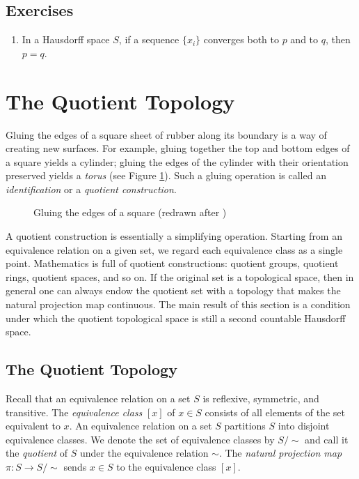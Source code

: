 \subsection{Exercises}
\begin{enumerate}
	\item   In a Hausdorff space $S$, if a sequence $\{x_i\}$ converges both to
	      $p$ and to $q$, then $p=q$.

\end{enumerate}




\section{The Quotient Topology}
\label{sec:quotient-topology}

Gluing the edges of a square sheet of rubber along its boundary is a way of
creating new surfaces. For example, gluing together the top and bottom edges
of a square yields a cylinder; gluing the edges of the cylinder with their
orientation preserved yields a \emph{torus} (see Figure
\ref{fig:glue-edge-of-a-square}). Such a gluing operation is called an
\emph{identification} or a \emph{quotient construction}.

\begin{figure}[ht]
	\centering
	\caption{Gluing the edges of a square (redrawn after
		\cite{tu_introduction_2011})}
	\label{fig:glue-edge-of-a-square}
\end{figure}

A quotient construction is essentially a simplifying operation. Starting from
an equivalence relation on a given set, we regard each equivalence class as a
single point. Mathematics is full of quotient constructions: quotient groups,
quotient rings, quotient spaces, and so on. If the original set is a
topological space, then in general one can always endow the quotient set with
a topology that makes the natural projection map continuous. The main result
of this section is a condition under which the quotient topological space is
still a second countable Hausdorff space.

\subsection{The Quotient Topology}

Recall that an equivalence relation on a set $S$ is reflexive, symmetric, and
transitive. The \emph{equivalence class} $[x]$ of $x\in S$ consists of all
elements of the set equivalent to $x$. An equivalence relation on a set $S$
partitions $S$ into disjoint equivalence classes. We denote the set of
equivalence classes by $S/\sim$ and call it the \emph{quotient} of $S$ under
the equivalence relation $\sim$. The \emph{natural projection map} $\pi: S\to
	S/\sim$ sends $x\in S$ to the equivalence class $[x]$.

